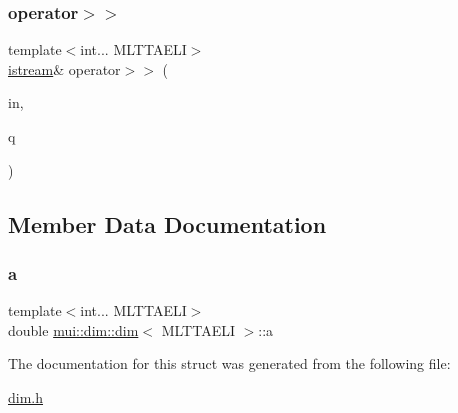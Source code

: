 \subsubsection{\texorpdfstring{operator$>$$>$}{operator>>}}
{\footnotesize\ttfamily template$<$int... M\+L\+T\+T\+A\+E\+LI$>$ \\
\hyperlink{classmui_1_1istream}{istream}\& operator$>$$>$ (\begin{DoxyParamCaption}\item[{\hyperlink{classmui_1_1istream}{istream} \&}]{in,  }\item[{\hyperlink{structmui_1_1dim_1_1dim}{dim}$<$ M\+L\+T\+T\+A\+E\+LI $>$}]{q }\end{DoxyParamCaption})\hspace{0.3cm}{\ttfamily [friend]}}



\subsection{Member Data Documentation}
\mbox{\label{structmui_1_1dim_1_1dim_a40ca9d786e371cc4dd9c125fa99980e6}} 
\subsubsection{\texorpdfstring{a}{a}}
{\footnotesize\ttfamily template$<$int... M\+L\+T\+T\+A\+E\+LI$>$ \\
double \hyperlink{structmui_1_1dim_1_1dim}{mui\+::dim\+::dim}$<$ M\+L\+T\+T\+A\+E\+LI $>$\+::a}



The documentation for this struct was generated from the following file\+:\begin{DoxyCompactItemize}
\item 
\hyperlink{dim_8h}{dim.\+h}\end{DoxyCompactItemize}
